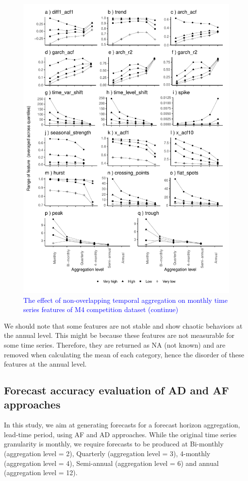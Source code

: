 \documentclass[preprint, 3p,
authoryear]{elsarticle} %
\begin{document}
\begin{figure}[H]

{\centering \includegraphics[width=0.7\linewidth]{img/300dpi/mp_category_all2} 

}

\caption{ \textcolor{blue}{The effect of non-overlapping temporal aggregation on monthly time series features of M4 competition dataset (continue)} }\label{fig:featureagg2}
\end{figure}

We should note that some features are not stable and show chaotic
behaviors at the annual level. This might be because these features are
not measurable for some time series. Therefore, they are returned as NA
(not known) and are removed when calculating the mean of each category,
hence the disorder of these features at the annual level.

\hypertarget{forecast-accuracy-evaluation-of-ad-and-af-approaches}{%
\subsection{Forecast accuracy evaluation of AD and AF
approaches}\label{forecast-accuracy-evaluation-of-ad-and-af-approaches}}

In this study, we aim at generating forecasts for a forecast horizon
aggregation, lead-time period, using AF and AD approaches. While the
original time series granularity is monthly, we require forecasts to be
produced at Bi-monthly (aggregation level = 2), Quarterly (aggregation
level = 3), 4-monthly (aggregation level = 4), Semi-annual (aggregation
level = 6) and annual (aggregation level = 12).
\end{document}

